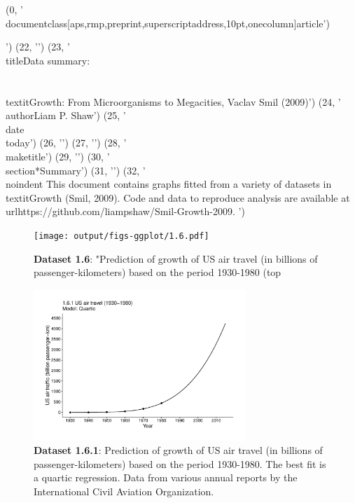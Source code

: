 (0, '\\documentclass[aps,rmp,preprint,superscriptaddress,10pt,onecolumn]{article}\n')
\begin{document}
\n')
(22, '\n')
(23, '\\title{Data summary:\\\\\\textit{Growth: From Microorganisms to Megacities}, Vaclav Smil (2009)}\n')
(24, '\\author{Liam P. Shaw}\n')
(25, '\\date{\\today}\n')
(26, '\n')
(27, '\n')
(28, '\\maketitle\n')
(29, '\n')
(30, '\\section*{Summary}\n')
(31, '\n')
(32, '\\noindent This document contains graphs fitted from a variety of datasets in \\textit{Growth} (Smil, 2009). Code and data to reproduce analysis are available at \\url{https://github.com/liampshaw/Smil-Growth-2009}. \n')
\begin{figure}[h]
\texttt{[image: output/figs-ggplot/1.6.pdf]}
\caption{\textbf{Dataset 1.6}: "Prediction of growth of US air travel (in billions of passenger-kilometers) based on the period 1930-1980 (top}
\end{figure}
	
\begin{figure}[h]
\includegraphics[width=8cm]{output/figs-ggplot/1.6.1.pdf}
\caption{\textbf{Dataset 1.6.1}: Prediction of growth of US air travel (in billions of passenger-kilometers) based on the period 1930-1980. The best fit is a quartic regression. Data from various annual reports by the International Civil Aviation Organization. }
\end{figure}
	
\end{document}
